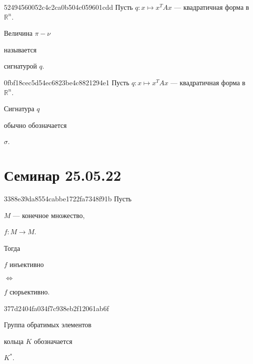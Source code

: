 \begin{note}{52494560052c4c2ca0b504c059601cdd}
    Пусть \({ q : x \mapsto x^{T}Ax }\) --- квадратичная форма в \({ \mathbb R^{n} }\).
    \begin{icloze}{1}Величина \({ \pi - \nu }\)\end{icloze} называется \begin{icloze}{2}сигнатурой \({ q }\).\end{icloze}
\end{note}

\begin{note}{0fbf18cec5d54ec6823be4c8821294e1}
    Пусть \({ q : x \mapsto x^{T}Ax }\) --- квадратичная форма в \({ \mathbb R^{n} }\).
    \begin{icloze}{2}Сигнатура \({ q }\)\end{icloze} обычно обозначается \begin{icloze}{1}\({ \sigma }\).\end{icloze}
\end{note}

\section{Семинар 25.05.22}
\begin{note}{3388e39da8554cabbe1722fa7348f91b}
    Пусть \begin{icloze}{4}\({ M }\) --- конечное множество,\end{icloze}\: \begin{icloze}{5}\({ f : M \to M }\).\end{icloze}
    Тогда
    \begin{center}
        \begin{icloze}{3}\({ f }\) инъективно\end{icloze} \begin{icloze}{1}\({ \iff }\)\end{icloze} \begin{icloze}{2}\({ f }\) сюрьективно.\end{icloze}
    \end{center}
\end{note}

\begin{note}{377d2404fa034f7c938eb2f12061ab6f}
    \begin{icloze}{2}Группа обратимых элементов\end{icloze} кольца \({ K }\) обозначается \begin{icloze}{1}\({ K^* }\).\end{icloze}
\end{note}



